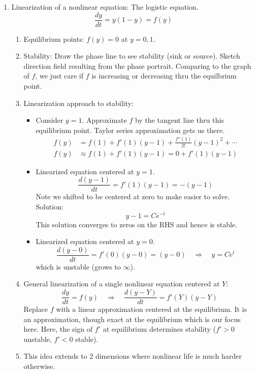\documentclass{article}
\begin{document}
\begin{enumerate}
\item Linearization of a nonlinear equation: The logistic equation.
\[
\frac{dy}{dt} = y(1-y) = f(y)
\]
\begin{enumerate}
\item Equilibrium points: $f(y)=0$ at $y=0,1$. 
\item Stability: Draw the phase line to see stability (sink or source). Sketch direction field resulting from the phase portrait. Comparing to the graph of $f$, we just care if $f$ is increasing or decreasing thru the equilbrium point.
\item Linearization approach to stability: 
\begin{itemize}
\item Consider $y=1$. Approximate $f$ by the tangent line thru this equilibrium point. Taylor series approximation gets us there.
\begin{align*}
f(y) &= f(1) + f'(1)(y-1) + \frac{f''(1)}{2!}(y-1)^2 + \cdots \\
f(y) &\approx f(1) + f'(1)(y-1) = 0 + f'(1)(y-1)
\end{align*}
\item Linearized equation centered at $y=1$.
\[
\frac{d(y-1)}{dt} = f'(1)(y-1) = -(y-1)
\]
Note we shifted to be centered at zero to make easier to solve. Solution:
\[
y-1 = Ce^{-t}
\]
This solution converges to zeros on the RHS and hence is stable.
\item Linearized equation centered at $y=0$.
\[
\frac{d(y-0)}{dt} = f'(0)(y-0) = (y-0) \quad \Rightarrow \quad y = Ce^t
\]
which is unstable (grows to $\infty$).
\end{itemize}
\item General linearization of a single nonlinear equation centered at $Y$:
\[
\frac{dy}{dt} = f(y) \quad \Rightarrow \quad \frac{d(y-Y)}{dt} = f'(Y)(y-Y)
\]
Replace $f$ with a linear approximation centered at the equilibrium. It is an approximation, though exact at the equilibrium which is our focus here. Here, the sign of $f'$ at equilibrium determines stability ($f'>0$ unstable, $f'<0$ stable).
\item This idea extends to 2 dimensions where nonlinear life is much harder otherwise.
\end{enumerate}


\end{enumerate}
\end{document}
